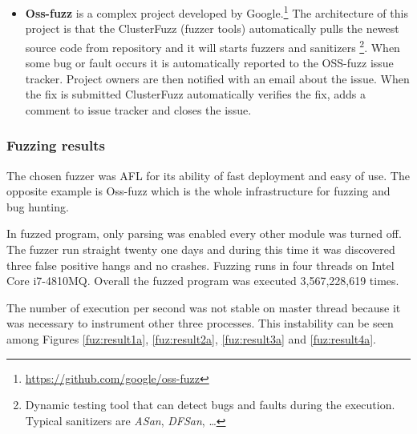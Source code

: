 \begin{itemize}
	\item \textbf{Oss-fuzz} is a complex project developed by Google.\footnote{\url{https://github.com/google/oss-fuzz}}
	The architecture of this project is that the ClusterFuzz (fuzzer tools)
	automatically pulls the newest source code from repository and it will starts
	fuzzers and sanitizers \footnote{Dynamic testing tool that can detect bugs and
	faults during the execution. Typical sanitizers are \textit{ASan},
	\textit{DFSan}, \ldots}. When some bug or fault occurs it is automatically
	reported to the OSS-fuzz issue tracker. Project owners are then notified with
	an email about the issue. When the fix is submitted ClusterFuzz automatically
	verifies the fix, adds a comment to issue tracker and closes the issue.

\end{itemize}


\subsubsection{Fuzzing results}
The chosen fuzzer was AFL for its ability of fast deployment and easy of use.
The opposite example is Oss-fuzz which is the whole infrastructure for fuzzing and bug hunting.

In fuzzed program, only parsing was enabled every other module was turned off.
The fuzzer run straight twenty one days and during this time it was discovered
three false positive hangs and no crashes. Fuzzing runs in four threads on Intel
Core i7-4810MQ. Overall the fuzzed program was executed 3,567,228,619 times.

The number of execution per second was not stable on master thread because it
was necessary to instrument other three processes. This instability can be
seen among Figures \ref{fuz:result1a}, \ref{fuz:result2a}, \ref{fuz:result3a}
and \ref{fuz:result4a}.


